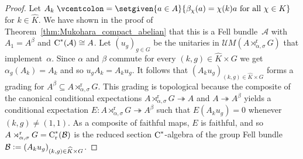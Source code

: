 \documentclass[a4paper]{amsart}
\theoremstyle{plain}
\theoremstyle{definition}
\theoremstyle{remark}
\numberwithin{theorem}{section}
\numberwithin{equation}{section}
\newcommand*{\nb}{\nobreakdash}
\newcommand*{\red}{\mathrm{r}}%
\newcommand*{\Cst}{\textup C^*}%
\newcommand*{\UMult}{\mathcal UM}%
\newcommand*{\B}{\mathcal B}%
\newcommand*{\A}{\mathcal A}%
\newcommand*{\defeq}{\mathrel{\vcentcolon=}}%
\newcommand*{\onto}{\twoheadrightarrow}
\begin{document}
\begin{proof}
  Let \(A_k\defeq \setgiven{a\in A}{ \beta_{\chi}(a)=  \chi(k) a \text{
      for all }\chi\in K}\) for \(k\in \widehat{K}\).
  We have shown in the proof of
  Theorem~\ref{thm:Mukohara_compact_abelian} that this is a Fell
  bundle~\(\A\) with \(A_1 = A^\beta\) and \(\Cst(\A) \cong A\).
  Let \((u_g)_{g\in G}\) be the unitaries in
  \(\UMult(A\rtimes_{\alpha,\sigma}^\red G)\) that
  implement~\(\alpha\).
  Since \(\alpha\) and \(\beta\) commute for every \((k,g)\in
  \widehat{K}\times G\) we get \(\alpha_g(A_k)=A_k\) and so \(u_g
  A_k=A_k u_g\).
  It follows that \((A_ku_g)_{(k,g)\in \widehat{K}\times G}\) forms a
  grading for \(A^\beta\subseteq A\rtimes_{\alpha,\sigma}^\red G\).
  This grading is topological because the composite of the canonical
  conditional expectations \(A\rtimes_{\alpha,\sigma}^\red G\onto A\)
  and \(A\onto A^\beta\) yields a conditional expectation \(E\colon
  A\rtimes_{\alpha,\sigma}^\red G\onto A^\beta\) such that \(E(A_k
  u_g)=0\) whenever \((k,g)\neq (1,1)\).
  As a composite of faithful maps, \(E\) is faithful, and so
  \(A\rtimes_{\alpha,\sigma}^\red G=\Cst_\red(\B)\) is the reduced
  section \(\Cst\)\nb-algebra of the group Fell bundle
  \(\B\defeq (A_ku_g)_{(k,g)\in \widehat{K}\times G}\).


\end{proof}
\end{document}
